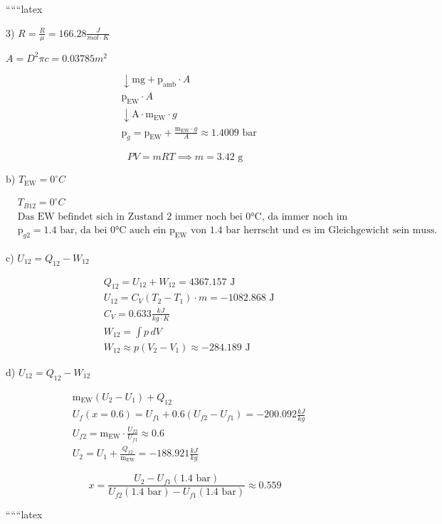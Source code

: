 
``````latex


3) \( R = \frac{R}{\mu} = 166.28 \frac{J}{mol \cdot K} \)

\( A = D^2 \pi c = 0.03785 m^2 \)

\[
\begin{aligned}
    &\downarrow \text{mg} + \text{p}_{\text{amb}} \cdot A \\
    &\text{p}_{\text{EW}} \cdot A \\
    &\downarrow \text{A} \cdot \text{m}_{\text{EW}} \cdot g \\
    &\text{p}_g = \text{p}_{\text{EW}} + \frac{\text{m}_{\text{EW}} \cdot g}{A} \approx 1.4009 \text{ bar}
\end{aligned}
\]

\[
PV = mRT \implies m = 3.42 \text{ g}
\]

b) \( T_{\text{EW}} = 0^\circ C \)

\[
\begin{aligned}
    &T_{B12} = 0^\circ C \\
    &\text{Das EW befindet sich in Zustand 2 immer noch bei 0°C, da immer noch im zwei-phasen Zustand befindet sich im Gleichgewicht.} \\
    &\text{p}_{g2} = 1.4 \text{ bar, da bei 0°C auch ein p}_{\text{EW}} \text{ von 1.4 bar herrscht und es im Gleichgewicht sein muss.}
\end{aligned}
\]

c) \( U_{12} = Q_{12} - W_{12} \)

\[
\begin{aligned}
    &Q_{12} = U_{12} + W_{12} = 4367.157 \text{ J} \\
    &U_{12} = C_V (T_2 - T_1) \cdot m = -1082.868 \text{ J} \\
    &C_V = 0.633 \frac{kJ}{kg \cdot K} \\
    &W_{12} = \int p \, dV \\
    &W_{12} \approx p (V_2 - V_1) \approx -284.189 \text{ J}
\end{aligned}
\]

d) \( U_{12} = Q_{12} - W_{12} \)

\[
\begin{aligned}
    &\text{m}_{\text{EW}} (U_2 - U_1) + Q_{12} \\
    &U_f (x = 0.6) = U_{f1} + 0.6 (U_{f2} - U_{f1}) = -200.092 \frac{kJ}{kg} \\
    &U_{f2} = \text{m}_{\text{EW}} \cdot \frac{U_{f2}}{U_{f1}} \approx 0.6 \\
    &U_2 = U_1 + \frac{Q_{12}}{\text{m}_{\text{EW}}} = -188.921 \frac{kJ}{kg}
\end{aligned}
\]

\[
x = \frac{U_2 - U_{f1} (1.4 \text{ bar})}{U_{f2} (1.4 \text{ bar}) - U_{f1} (1.4 \text{ bar})} \approx 0.559
\]

``````latex



